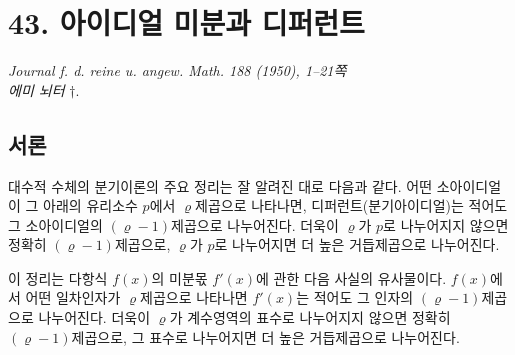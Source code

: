 
\section*{43. 아이디얼 미분과 디퍼런트}

\begin{center}
\emph{Journal f. d. reine u. angew. Math. 188 (1950), 1--21쪽}\\[0.75ex]
\emph{에미 뇌터} \(\dagger\).
\end{center}


\subsection*{서론}

대수적 수체의 분기이론의 주요 정리는 잘 알려진 대로 다음과 같다. 어떤 소아이디얼이 그 아래의 유리소수 \(p\)에서 \(\varrho\)제곱으로 나타나면, 디퍼런트(분기아이디얼)는 적어도 그 소아이디얼의 \((\varrho-1)\)제곱으로 나누어진다. 더욱이 \(\varrho\)가 \(p\)로 나누어지지 않으면 정확히 \((\varrho-1)\)제곱으로, \(\varrho\)가 \(p\)로 나누어지면 더 높은 거듭제곱으로 나누어진다.

이 정리는 다항식 \(f(x)\)의 미분몫 \(f'(x)\)에 관한 다음 사실의 유사물이다. \(f(x)\)에서 어떤 일차인자가 \(\varrho\)제곱으로 나타나면 \(f'(x)\)는 적어도 그 인자의 \((\varrho-1)\)제곱으로 나누어진다. 더욱이 \(\varrho\)가 계수영역의 표수로 나누어지지 않으면 정확히 \((\varrho-1)\)제곱으로, 그 표수로 나누어지면 더 높은 거듭제곱으로 나누어진다.

